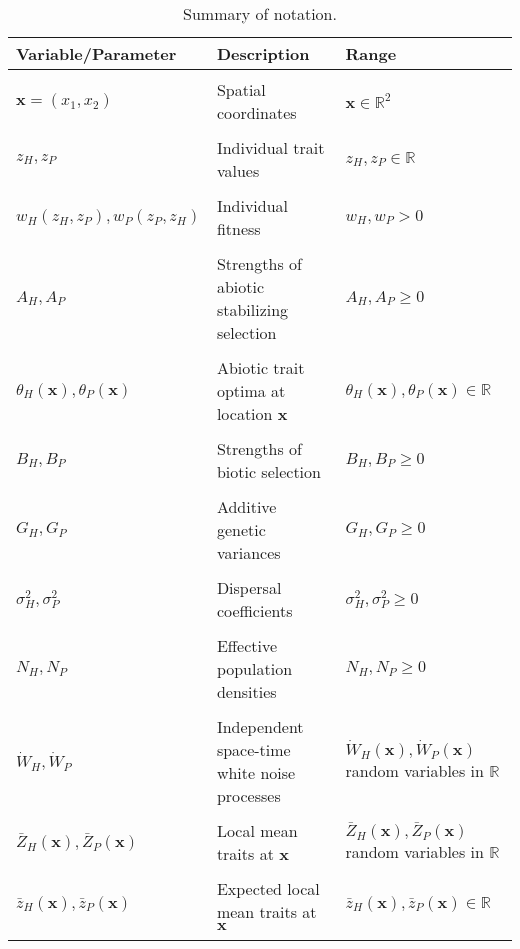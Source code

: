 \documentclass{article}
\begin{document}
\begin{table}[htbp]
\caption{Summary of notation.}
\label{Table:Parameters}
\centering
\begin{tabular}{lll}\hline
Variable/Parameter                  & Description                                  & Range                                                     \\ \hline \\
$\pmb x=(x_1,x_2)$                  & Spatial coordinates                          & $\pmb x\in\mathbb R^2$                                    \\ \\
$z_H,z_P$                           & Individual trait values                      & $z_H,z_P\in\mathbb R$                                     \\ \\
$w_H(z_H,z_P),w_P(z_P,z_H)$         & Individual fitness                           & $w_H,w_P>0$                                               \\ \\
$A_H,A_P$                           & Strengths of abiotic stabilizing selection   & $A_H,A_P\geq0$                                            \\ \\
$\theta_H(\pmb x),\theta_P(\pmb x)$ & Abiotic trait optima at location $\pmb x$    & $\theta_H(\pmb x),\theta_P(\pmb x)\in\mathbb R$           \\ \\
$B_H,B_P$                           & Strengths of biotic selection                & $B_H,B_P\geq0$                                            \\ \\
$G_H,G_P$                           & Additive genetic variances                   & $G_H,G_P\geq0$                                            \\ \\
$\sigma^2_H,\sigma^2_P$             & Dispersal coefficients                       & $\sigma^2_H,\sigma^2_P\geq0$                                            \\ \\
$N_H,N_P$                           & Effective population densities               & $N_H,N_P\geq0$                                            \\ \\
$\dot W_H,\dot W_P$                 & Independent space-time white noise processes & $\dot W_H(\pmb x),\dot W_P(\pmb x)$ random variables in $\mathbb R$ \\ \\
$\bar Z_H(\pmb x),\bar Z_P(\pmb x)$ & Local mean traits at $\pmb x$                & $\bar Z_H(\pmb x),\bar Z_P(\pmb x)$ random variables in $\mathbb R$ \\ \\
$\bar z_H(\pmb x),\bar z_P(\pmb x)$ & Expected local mean traits at $\pmb x$       & $\bar z_H(\pmb x),\bar z_P(\pmb x)\in\mathbb R$                     \\ \\ \hline
\end{tabular}
\bigskip{}
\end{table}
\end{document}

